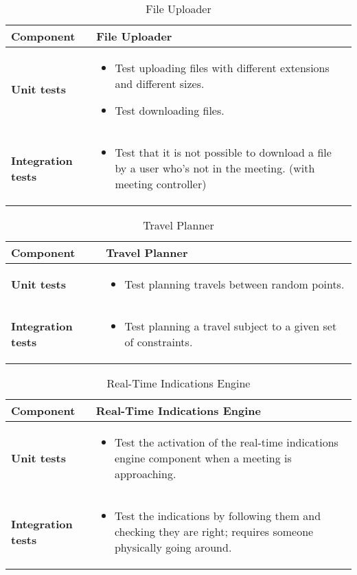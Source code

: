 \begin{table}[h]	
	\centering
	\def\arraystretch{1.5}
	\begin{tabular}{|m{4cm}|m{12cm}|}
		\hline
		\textbf{Component} & File Uploader \\ \hline
		\textbf{Unit tests} & 
			\begin{itemize}
			\item Test uploading files with different extensions and different sizes.
			\item Test downloading files.
			\end{itemize} \\ \hline
		\textbf{Integration tests} & 
			\begin{itemize}
			\item Test that it is not possible to download a file by a user who's not in the meeting. (with meeting controller)
			\end{itemize}  \\ \hline
	\end{tabular}
	\caption{File Uploader}
\end{table}

\begin{table}[h]	
	\centering
	\def\arraystretch{1.5}
	\begin{tabular}{|m{4cm}|m{12cm}|}
		\hline
		\textbf{Component} & Travel Planner \\ \hline
		\textbf{Unit tests} & 
			\begin{itemize}
			\item Test planning travels between random points.
			\end{itemize} \\ \hline
		\textbf{Integration tests} & 
			\begin{itemize}
			\item Test planning a travel subject to a given set of constraints.
			\end{itemize} \\ \hline
	\end{tabular}
	\caption{Travel Planner}
\end{table}

\begin{table}[h]	
	\centering
	\def\arraystretch{1.5}
	\begin{tabular}{|m{4cm}|m{12cm}|}
		\hline
		\textbf{Component} & Real-Time Indications Engine \\ \hline
		\textbf{Unit tests} & 
			\begin{itemize}
			\item Test the activation of the real-time indications engine component when a meeting is approaching.
			\end{itemize} \\ \hline
		\textbf{Integration tests} & 
			\begin{itemize}
			\item Test the indications by following them and checking they are right; requires someone physically going around.
			\end{itemize}   \\ \hline
	\end{tabular}
	\caption{Real-Time Indications Engine}
\end{table}

